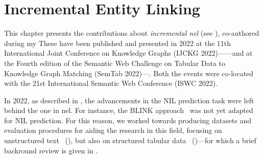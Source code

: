 \chapter{Incremental Entity Linking}

This chapter presents the contributions about \emph{incremental \acl{nel}} (see ), co-authored during my \phd  These have been published and presented in 2022 at the 11th International Joint Conference on Knowledge Graphs (IJCKG 2022)---\textcite{ijckg2022}---and at the Fourth edition of the Semantic Web Challenge on Tabular Data to Knowledge Graph Matching (SemTab 2022)---\textcite{mammotab}. Both the events were co-located with the 21st International Semantic Web Conference (ISWC 2022).

In 2022, as described in , the advancements in the NIL prediction task were left behind the one in \ac{nel}. For instance, the BLINK approach~\cite{blink} was not yet adapted for NIL prediction.
For this reason, we worked towards producing datasets and evaluation procedures for aiding the research in this field, focusing on unstructured text~\cite{ijckg2022} (), but also on structured tabular data~\cite{mammotab} ()---for which a brief backround review is given in .

